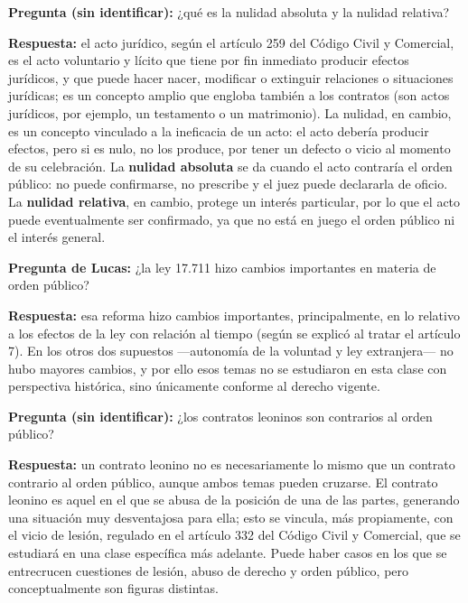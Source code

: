 \documentclass[12pt,oneside]{book}
\begin{document}
\begin{note}
\textbf{Pregunta (sin identificar):} ¿qué es la nulidad absoluta y la nulidad relativa?

\textbf{Respuesta:} el acto jurídico, según el artículo 259 del Código Civil y Comercial, es el acto voluntario y lícito que tiene por fin inmediato producir efectos jurídicos, y que puede hacer nacer, modificar o extinguir relaciones o situaciones jurídicas; es un concepto amplio que engloba también a los contratos (son actos jurídicos, por ejemplo, un testamento o un matrimonio). La nulidad, en cambio, es un concepto vinculado a la ineficacia de un acto: el acto debería producir efectos, pero si es nulo, no los produce, por tener un defecto o vicio al momento de su celebración. La \textbf{nulidad absoluta} se da cuando el acto contraría el orden público: no puede confirmarse, no prescribe y el juez puede declararla de oficio. La \textbf{nulidad relativa}, en cambio, protege un interés particular, por lo que el acto puede eventualmente ser confirmado, ya que no está en juego el orden público ni el interés general.
\end{note}

\begin{note}
\textbf{Pregunta de Lucas:} ¿la ley 17.711 hizo cambios importantes en materia de orden público?

\textbf{Respuesta:} esa reforma hizo cambios importantes, principalmente, en lo relativo a los efectos de la ley con relación al tiempo (según se explicó al tratar el artículo 7). En los otros dos supuestos —autonomía de la voluntad y ley extranjera— no hubo mayores cambios, y por ello esos temas no se estudiaron en esta clase con perspectiva histórica, sino únicamente conforme al derecho vigente.
\end{note}

\begin{note}
\textbf{Pregunta (sin identificar):} ¿los contratos leoninos son contrarios al orden público?

\textbf{Respuesta:} un contrato leonino no es necesariamente lo mismo que un contrato contrario al orden público, aunque ambos temas pueden cruzarse. El contrato leonino es aquel en el que se abusa de la posición de una de las partes, generando una situación muy desventajosa para ella; esto se vincula, más propiamente, con el vicio de lesión, regulado en el artículo 332 del Código Civil y Comercial, que se estudiará en una clase específica más adelante. Puede haber casos en los que se entrecrucen cuestiones de lesión, abuso de derecho y orden público, pero conceptualmente son figuras distintas.
\end{note}
\end{document}
